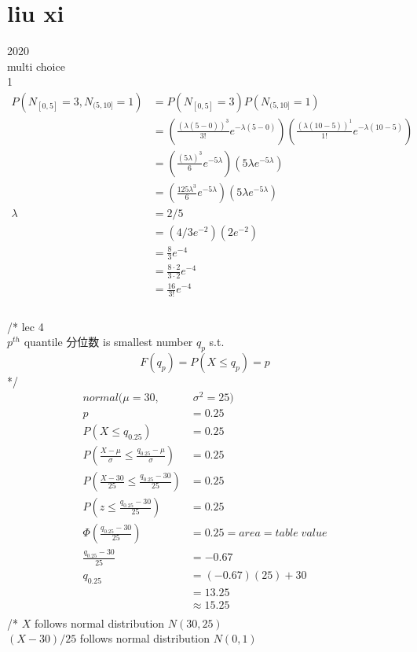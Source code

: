 \documentclass[12pt,border=4pt,multi]{article} %
\begin{document}
\section*{liu xi}
2020\\
multi choice\\
1
\begin{align*}
P(N_{[0, 5]} = 3, N_{(5, 10]} = 1) &= P(N_{[0, 5]} = 3)P(N_{(5, 10]} = 1)\\
&= \left(\frac{(\lambda (5 - 0))^3}{3!}e^{-\lambda(5 - 0)}\right)\left(\frac{(\lambda (10 - 5))^1}{1!}e^{-\lambda(10 - 5)}\right)\\
&= \left(\frac{(5\lambda)^3}{6}e^{-5\lambda}\right)\left(5\lambda e^{-5\lambda}\right)\\
&= \left(\frac{125\lambda^3}{6}e^{-5\lambda}\right)\left(5\lambda e^{-5\lambda}\right)\\
\lambda &= 2 / 5\\
&= (4 / 3 e^{-2})(2e^{-2})\\
&= \frac{8}{3}e^{-4}\\
&= \frac{8 \cdot 2}{3 \cdot 2}e^{-4}\\
&= \boxed{\frac{16}{3!}e^{-4}}\\
\end{align*}
\newpage
{}\\
/* lec 4\\
$p^{th}$ quantile 分位数 is smallest number $q_p$ s.t.
\[F(q_p) = P(X \leq q_p) = p\]
*/
\begin{align*}
normal(\mu = 30,&\; \sigma^2 = 25)\\
p &= 0.25\\
P(X \leq q_{0.25}) &= 0.25\\
P\left(\frac{X - \mu}{\sigma} \leq \frac{q_{0.25} - \mu}{\sigma}\right) &= 0.25\\
P\left(\frac{X - 30}{25} \leq \frac{q_{0.25} - 30}{25}\right) &= 0.25\\
P\left(z \leq \frac{q_{0.25} - 30}{25}\right) &= 0.25\\
\Phi\left(\frac{q_{0.25} - 30}{25}\right) &= 0.25 = area = table\;value\\
\frac{q_{0.25} - 30}{25} &= -0.67\\ 
q_{0.25} &= (-0.67)(25) + 30\\
&= 13.25\\
&\approx 15.25\\
\end{align*}
/* $X$ follows normal distribution $N(30, 25)$\\
$(X - 30) / 25$ follows normal distribution $N(0, 1)$\\
\end{document}
